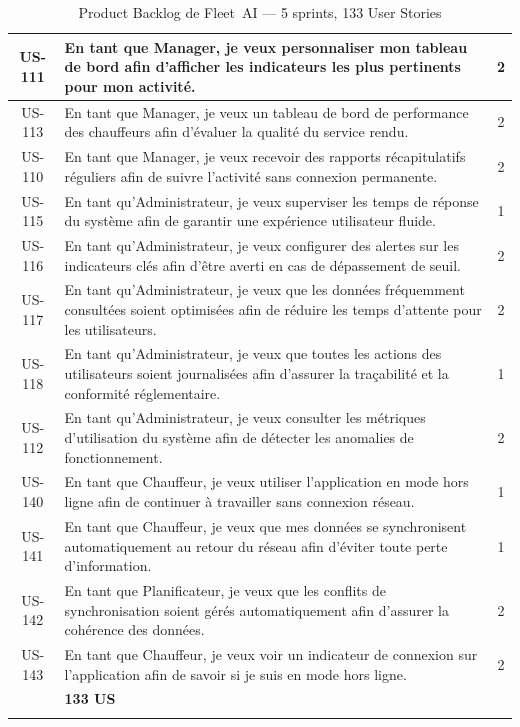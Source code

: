 \begin{longtable}{|c|>{\raggedright\arraybackslash}p{13cm}|c|}
US-111 & En tant que Manager, je veux personnaliser mon tableau de bord afin d'afficher les indicateurs les plus pertinents pour mon activité. & 2 \\\hline
US-113 & En tant que Manager, je veux un tableau de bord de performance des chauffeurs afin d'évaluer la qualité du service rendu. & 2 \\\hline
US-110 & En tant que Manager, je veux recevoir des rapports récapitulatifs réguliers afin de suivre l'activité sans connexion permanente. & 2 \\\hline
US-115 & En tant qu'Administrateur, je veux superviser les temps de réponse du système afin de garantir une expérience utilisateur fluide. & 1 \\\hline
US-116 & En tant qu'Administrateur, je veux configurer des alertes sur les indicateurs clés afin d'être averti en cas de dépassement de seuil. & 2 \\\hline
US-117 & En tant qu'Administrateur, je veux que les données fréquemment consultées soient optimisées afin de réduire les temps d'attente pour les utilisateurs. & 2 \\\hline
US-118 & En tant qu'Administrateur, je veux que toutes les actions des utilisateurs soient journalisées afin d'assurer la traçabilité et la conformité réglementaire. & 1 \\\hline
US-112 & En tant qu'Administrateur, je veux consulter les métriques d'utilisation du système afin de détecter les anomalies de fonctionnement. & 2 \\\hline
US-140 & En tant que Chauffeur, je veux utiliser l'application en mode hors ligne afin de continuer à travailler sans connexion réseau. & 1 \\\hline
US-141 & En tant que Chauffeur, je veux que mes données se synchronisent automatiquement au retour du réseau afin d'éviter toute perte d'information. & 1 \\\hline
US-142 & En tant que Planificateur, je veux que les conflits de synchronisation soient gérés automatiquement afin d'assurer la cohérence des données. & 2 \\\hline
US-143 & En tant que Chauffeur, je veux voir un indicateur de connexion sur l'application afin de savoir si je suis en mode hors ligne. & 2 \\\hline

\hline
\rowcolor{headerbg}
\multicolumn{2}{|c|}{\textbf{Total}} & \textbf{133 US} \\
\hline

\caption{Product Backlog de Fleet~AI --- 5 sprints, 133 User Stories}
\end{longtable}
\setlength{\arrayrulewidth}{0.4pt}

